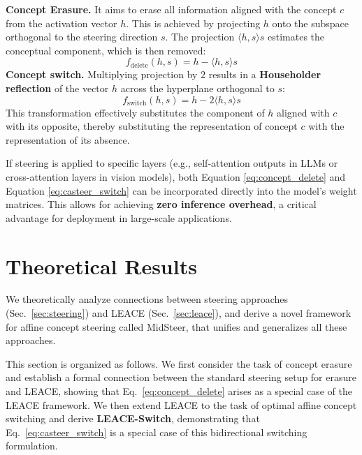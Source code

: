 \documentclass{article}
\theoremstyle{plain}
\theoremstyle{definition}
\theoremstyle{remark}
\begin{document}
\noindent \textbf{Concept Erasure.}
\noindent It aims to erase all information aligned with the concept $c$ from the activation vector $h$. This is achieved by projecting $h$ onto the subspace orthogonal to the steering direction $s$. The projection $\langle h, s \rangle s$ estimates the conceptual component, which is then removed:
\begin{equation}
f_{\text{delete}}(h, s) = h - \langle h, s \rangle s
\label{eq:concept_delete}
\end{equation}
\noindent \textbf{Concept switch.}
Multiplying projection by $2$ results in a \textbf{Householder reflection} of the vector $h$ across the hyperplane orthogonal to $s$:
\begin{equation}
f_{\text{switch}}(h, s) = h - 2 \langle h, s \rangle s
\label{eq:casteer_switch}
\end{equation}
\noindent This transformation effectively substitutes the component of $h$ aligned with $c$ with its opposite, thereby substituting the representation of concept $c$ with the representation of its absence.

\noindent If steering is applied to specific layers (e.g., self-attention outputs in LLMs or cross-attention layers in vision models), both Equation \ref{eq:concept_delete} and Equation \ref{eq:casteer_switch} can be incorporated directly into the model's weight matrices. This allows for achieving \textbf{zero inference overhead}, a critical advantage for deployment in large-scale applications.




\section{Theoretical Results}

We theoretically analyze connections between steering approaches (Sec.~\ref{sec:steering}) and LEACE (Sec.~\ref{sec:leace}), and derive a novel framework for affine concept steering called MidSteer, that unifies and generalizes all these approaches.

This section is organized as follows. We first consider the task of concept erasure and establish a formal connection between the standard steering setup for erasure and LEACE, showing that Eq.~\ref{eq:concept_delete} arises as a special case of the LEACE framework. We then extend LEACE to the task of optimal affine concept switching and derive \textbf{LEACE-Switch}, demonstrating that Eq.~\ref{eq:casteer_switch} is a special case of this bidirectional switching formulation.
\end{document}

